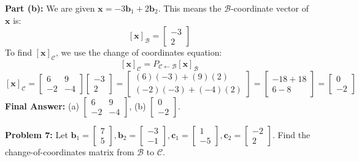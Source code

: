 \documentclass[11pt]{article}
\begin{document}
\textbf{Part (b):} We are given $\mathbf{x} = -3\mathbf{b}_1 + 2\mathbf{b}_2$. This means the $\mathcal{B}$-coordinate vector of $\mathbf{x}$ is:
\[ [\mathbf{x}]_{\mathcal{B}} = \begin{bmatrix} -3 \\ 2 \end{bmatrix} \]
To find $[\mathbf{x}]_{\mathcal{C}}$, we use the change of coordinates equation:
\[ [\mathbf{x}]_{\mathcal{C}} = P_{\mathcal{C} \leftarrow \mathcal{B}} [\mathbf{x}]_{\mathcal{B}} \]
\[ [\mathbf{x}]_{\mathcal{C}} = \begin{bmatrix} 6 & 9 \\ -2 & -4 \end{bmatrix} \begin{bmatrix} -3 \\ 2 \end{bmatrix} = \begin{bmatrix} (6)(-3) + (9)(2) \\ (-2)(-3) + (-4)(2) \end{bmatrix} = \begin{bmatrix} -18 + 18 \\ 6 - 8 \end{bmatrix} = \begin{bmatrix} 0 \\ -2 \end{bmatrix} \]
\textbf{Final Answer:} (a) $\begin{bmatrix} 6 & 9 \\ -2 & -4 \end{bmatrix}$, (b) $\begin{bmatrix} 0 \\ -2 \end{bmatrix}$.

\vspace{0.5cm}

\textbf{Problem 7:} Let $\mathbf{b}_1 = \begin{bmatrix} 7 \\ 5 \end{bmatrix}, \mathbf{b}_2 = \begin{bmatrix} -3 \\ -1 \end{bmatrix}, \mathbf{c}_1 = \begin{bmatrix} 1 \\ -5 \end{bmatrix}, \mathbf{c}_2 = \begin{bmatrix} -2 \\ 2 \end{bmatrix}$. Find the change-of-coordinates matrix from $\mathcal{B}$ to $\mathcal{C}$.
\end{document}
